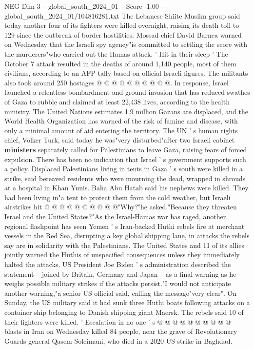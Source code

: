 \begin{textsample}{NEG Dim 3 – global\_south\_2024\_01 – Score -1.00 – global\_south\_2024\_01/104816281.txt}
The Lebanese Shiite Muslim group said today another four of its fighters were killed overnight, raising its death toll to 129 since the outbreak of border hostilities.
Mossad chief David Barnea warned on Wednesday that the Israeli spy agency"is committed to settling the score with the murderers"who carried out the Hamas attack. ' Hit in their sleep ' The October 7 attack resulted in the deaths of around 1,140 people, most of them civilians, according to an AFP tally based on official Israeli figures.
The militants also took around 250 hostages @ @ @ @ @ @ @ @ @ @.
In response, Israel launched a relentless bombardment and ground invasion that has reduced swathes of Gaza to rubble and claimed at least 22,438 lives, according to the health ministry.
The United Nations estimates 1.9 million Gazans are displaced, and the World Health Organization has warned of the risk of famine and disease, with only a minimal amount of aid entering the territory.
The UN ' s human rights chief, Volker Turk, said today he was"very disturbed"after two Israeli cabinet \textbf{ministers} separately called for Palestinians to leave Gaza, raising fears of forced expulsion.
There has been no indication that Israel ' s government supports such a policy.
Displaced Palestinians living in tents in Gaza ' s south were killed in a strike, said bereaved residents who were mourning the dead, wrapped in shrouds at a hospital in Khan Yunis.
Baha Abu Hatab said his nephews were killed.
They had been living in"a tent to protect them from the cold weather, but Israeli airstrikes hit @ @ @ @ @ @ @ @ @ @"Why?"he asked."Because they threaten Israel and the United States?"As the Israel-Hamas war has raged, another regional flashpoint has seen Yemen ' s Iran-backed Huthi rebels fire at merchant vessels in the Red Sea, disrupting a key global shipping lane, in attacks the rebels say are in solidarity with the Palestinians.
The United States and 11 of its allies jointly warned the Huthis of unspecified consequences unless they immediately halted the attacks.
US President Joe Biden ' s administration described the statement -- joined by Britain, Germany and Japan -- as a final warning as he weighs possible military strikes if the attacks persist."I would not anticipate another warning,"a senior US official said, calling the message"very clear".
On Sunday, the US military said it had sunk three Huthi boats following attacks on a container ship belonging to Danish shipping giant Maersk.
The rebels said 10 of their fighters were killed. ' Escalation in no one ' s @ @ @ @ @ @ @ @ @ @ blasts in Iran on Wednesday killed 84 people, near the grave of Revolutionary Guards general Qasem Soleimani, who died in a 2020 US strike in Baghdad.

\end{textsample}
